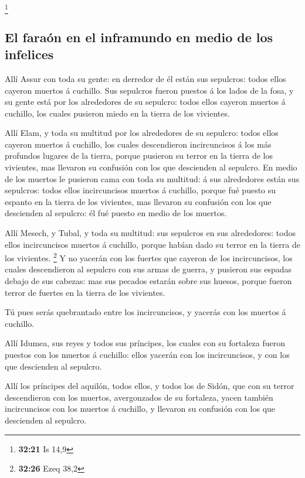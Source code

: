 \footnote{\textbf{32:21} Is 14,9}

\hypertarget{el-farauxf3n-en-el-inframundo-en-medio-de-los-infelices}{%
\subsection{El faraón en el inframundo en medio de los
infelices}\label{el-farauxf3n-en-el-inframundo-en-medio-de-los-infelices}}

 Allí Assur con toda su gente: en derredor de él están sus
sepulcros: todos ellos cayeron muertos á cuchillo.  Sus
sepulcros fueron puestos á los lados de la fosa, y su gente está por los
alrededores de su sepulcro: todos ellos cayeron muertos á cuchillo, los
cuales pusieron miedo en la tierra de los vivientes.

 Allí Elam, y toda su multitud por los alrededores de su
sepulcro: todos ellos cayeron muertos á cuchillo, los cuales
descendieron incircuncisos á los más profundos lugares de la tierra,
porque pusieron su terror en la tierra de los vivientes, mas llevaron su
confusión con los que descienden al sepulcro.  En medio de
los muertos le pusieron cama con toda su multitud: á sus alrededores
están sus sepulcros: todos ellos incircuncisos muertos á cuchillo,
porque fué puesto su espanto en la tierra de los vivientes, mas llevaron
su confusión con los que descienden al sepulcro: él fué puesto en medio
de los muertos.

 Allí Mesech, y Tubal, y toda su multitud: sus sepulcros en
sus alrededores: todos ellos incircuncisos muertos á cuchillo, porque
habían dado su terror en la tierra de los vivientes. \footnote{\textbf{32:26}
  Ezeq 38,2}  Y no yacerán con los fuertes que cayeron de
los incircuncisos, los cuales descendieron al sepulcro con sus armas de
guerra, y pusieron sus espadas debajo de sus cabezas: mas sus pecados
estarán sobre sus huesos, porque fueron terror de fuertes en la tierra
de los vivientes.

 Tú pues serás quebrantado entre los incircuncisos, y
yacerás con los muertos á cuchillo.

 Allí Idumea, sus reyes y todos sus príncipes, los cuales
con su fortaleza fueron puestos con los muertos á cuchillo: ellos
yacerán con los incircuncisos, y con los que descienden al sepulcro.

 Allí los príncipes del aquilón, todos ellos, y todos los
de Sidón, que con su terror descendieron con los muertos, avergonzados
de su fortaleza, yacen también incircuncisos con los muertos á cuchillo,
y llevaron su confusión con los que descienden al sepulcro.


